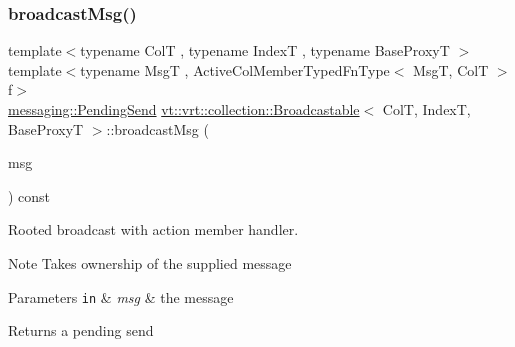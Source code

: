 \subsubsection{\texorpdfstring{broadcast\+Msg()}{broadcastMsg()}\hspace{0.1cm}{\footnotesize\ttfamily [2/3]}}
{\footnotesize\ttfamily template$<$typename ColT , typename IndexT , typename Base\+ProxyT $>$ \\
template$<$typename MsgT , Active\+Col\+Member\+Typed\+Fn\+Type$<$ Msg\+T, Col\+T $>$ f$>$ \\
\hyperlink{structvt_1_1messaging_1_1_pending_send}{messaging\+::\+Pending\+Send} \hyperlink{structvt_1_1vrt_1_1collection_1_1_broadcastable}{vt\+::vrt\+::collection\+::\+Broadcastable}$<$ ColT, IndexT, Base\+ProxyT $>$\+::broadcast\+Msg (\begin{DoxyParamCaption}\item[{\hyperlink{structvt_1_1messaging_1_1_msg_ptr_thief}{messaging\+::\+Msg\+Ptr\+Thief}$<$ MsgT $>$}]{msg }\end{DoxyParamCaption}) const}



Rooted broadcast with action member handler. 

\begin{DoxyNote}{Note}
Takes ownership of the supplied message
\end{DoxyNote}

\begin{DoxyParams}[1]{Parameters}
\mbox{\tt in}  & {\em msg} & the message\\
\hline
\end{DoxyParams}
\begin{DoxyReturn}{Returns}
a pending send 
\end{DoxyReturn}
\mbox{\label{structvt_1_1vrt_1_1collection_1_1_broadcastable_a9b50dd4776a129f168366e07af536160}} 
